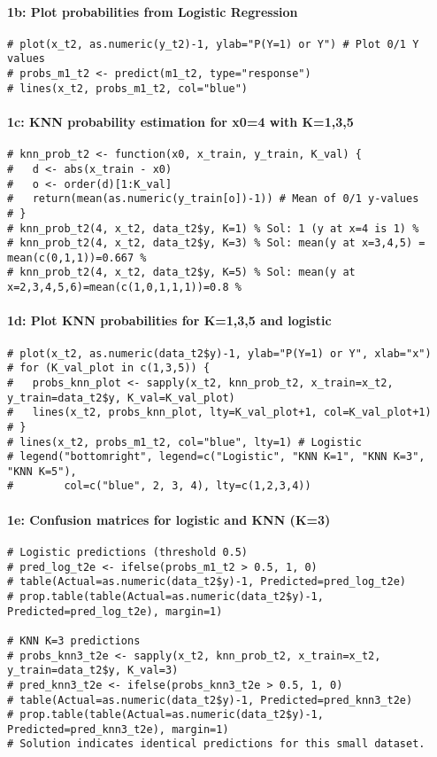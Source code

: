 \documentclass[12pt,a4paper]{article}
\begin{document}
            \paragraph{1b: Plot probabilities from Logistic Regression}
\begin{lstlisting}
# plot(x_t2, as.numeric(y_t2)-1, ylab="P(Y=1) or Y") # Plot 0/1 Y values
# probs_m1_t2 <- predict(m1_t2, type="response")
# lines(x_t2, probs_m1_t2, col="blue")
\end{lstlisting}
            \paragraph{1c: KNN probability estimation for x0=4 with K=1,3,5}
\begin{lstlisting}
# knn_prob_t2 <- function(x0, x_train, y_train, K_val) {
#   d <- abs(x_train - x0)
#   o <- order(d)[1:K_val]
#   return(mean(as.numeric(y_train[o])-1)) # Mean of 0/1 y-values
# }
# knn_prob_t2(4, x_t2, data_t2$y, K=1) % Sol: 1 (y at x=4 is 1) %
# knn_prob_t2(4, x_t2, data_t2$y, K=3) % Sol: mean(y at x=3,4,5) = mean(c(0,1,1))=0.667 %
# knn_prob_t2(4, x_t2, data_t2$y, K=5) % Sol: mean(y at x=2,3,4,5,6)=mean(c(1,0,1,1,1))=0.8 %
\end{lstlisting}
            \paragraph{1d: Plot KNN probabilities for K=1,3,5 and logistic}
\begin{lstlisting}
# plot(x_t2, as.numeric(data_t2$y)-1, ylab="P(Y=1) or Y", xlab="x")
# for (K_val_plot in c(1,3,5)) {
#   probs_knn_plot <- sapply(x_t2, knn_prob_t2, x_train=x_t2, y_train=data_t2$y, K_val=K_val_plot)
#   lines(x_t2, probs_knn_plot, lty=K_val_plot+1, col=K_val_plot+1)
# }
# lines(x_t2, probs_m1_t2, col="blue", lty=1) # Logistic
# legend("bottomright", legend=c("Logistic", "KNN K=1", "KNN K=3", "KNN K=5"),
#        col=c("blue", 2, 3, 4), lty=c(1,2,3,4))
\end{lstlisting}
            \paragraph{1e: Confusion matrices for logistic and KNN (K=3)}
\begin{lstlisting}
# Logistic predictions (threshold 0.5)
# pred_log_t2e <- ifelse(probs_m1_t2 > 0.5, 1, 0)
# table(Actual=as.numeric(data_t2$y)-1, Predicted=pred_log_t2e)
# prop.table(table(Actual=as.numeric(data_t2$y)-1, Predicted=pred_log_t2e), margin=1)

# KNN K=3 predictions
# probs_knn3_t2e <- sapply(x_t2, knn_prob_t2, x_train=x_t2, y_train=data_t2$y, K_val=3)
# pred_knn3_t2e <- ifelse(probs_knn3_t2e > 0.5, 1, 0)
# table(Actual=as.numeric(data_t2$y)-1, Predicted=pred_knn3_t2e)
# prop.table(table(Actual=as.numeric(data_t2$y)-1, Predicted=pred_knn3_t2e), margin=1)
# Solution indicates identical predictions for this small dataset.
\end{lstlisting}
\end{document}
